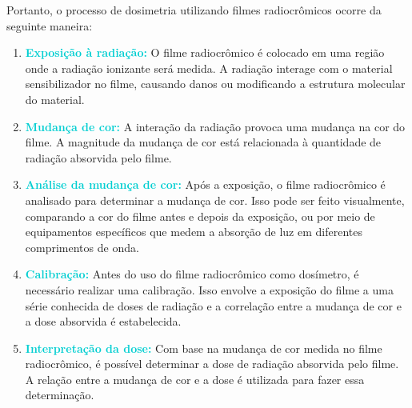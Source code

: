 \documentclass[11pt,a4paper]{article}
\begin{document}

	Portanto, o processo de dosimetria utilizando filmes radiocrômicos ocorre da seguinte maneira:
		\begin{enumerate}
			\item \textcolor{DarkTurquoise}{\textbf{Exposição à radiação:}} O filme radiocrômico é colocado em uma região onde a radiação ionizante será medida. A radiação interage com o material sensibilizador no filme, causando danos ou modificando a estrutura molecular do material.
			\item \textcolor{DarkTurquoise}{\textbf{Mudança de cor:}} A interação da radiação provoca uma mudança na cor do filme. A magnitude da mudança de cor está relacionada à quantidade de radiação absorvida pelo filme.
			\item \textcolor{DarkTurquoise}{\textbf{Análise da mudança de cor:}} Após a exposição, o filme radiocrômico é analisado para determinar a mudança de cor. Isso pode ser feito visualmente, comparando a cor do filme antes e depois da exposição, ou por meio de equipamentos específicos que medem a absorção de luz em diferentes comprimentos de onda.
			\item \textcolor{DarkTurquoise}{\textbf{Calibração:}} Antes do uso do filme radiocrômico como dosímetro, é necessário realizar uma calibração. Isso envolve a exposição do filme a uma série conhecida de doses de radiação e a correlação entre a mudança de cor e a dose absorvida é estabelecida.
			\item \textcolor{DarkTurquoise}{\textbf{Interpretação da dose:}} Com base na mudança de cor medida no filme radiocrômico, é possível determinar a dose de radiação absorvida pelo filme. A relação entre a mudança de cor e a dose é utilizada para fazer essa determinação.
		\end{enumerate}
\end{document}
